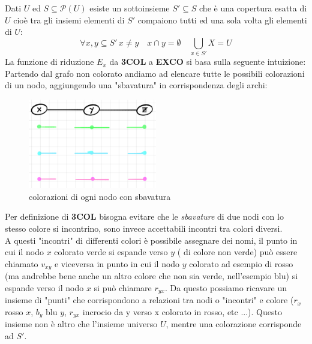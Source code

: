\documentclass[a4paper]{article}
\begin{document}
Dati $U$ ed $S \subseteq \mathcal{P}(U)$ esiste un sottoinsieme $S' \subseteq S$ che è una copertura esatta di $U$ cioè tra gli insiemi elementi di $S'$ compaiono tutti ed una sola volta gli elementi di $U$:
$$\forall x,y \subseteq S'\, x \neq y \quad x \cap y = \emptyset \quad \bigcup_{x \in S'}X = U$$
La funzione di riduzione $E_x$ da \textbf{3COL} a \textbf{EXCO} si basa sulla seguente intuizione:\\
Partendo dal grafo non colorato andiamo ad elencare tutte le possibili colorazioni di un nodo, aggiungendo una "sbavatura" in corrispondenza degli archi:
\newpage
\begin{figure}[!ht]
                \centering
                \includegraphics[width = 0.5\textwidth]{./img/E11_sbavatura.png}
                \caption{colorazioni di ogni nodo con sbavatura} \label{FIG:E11_sbavatura}
\end{figure}
Per definizione di \textbf{3COL} bisogna evitare che le \textit{sbavature} di due nodi con lo stesso colore si incontrino, sono invece accettabili incontri tra colori diversi.\\
A questi "incontri" di differenti colori è possibile assegnare dei nomi, il punto in cui il nodo $x$ colorato verde si espande verso $y$ ( di colore non verde) può essere chiamato $v_{xy}$ e viceversa in punto in cui il nodo $y$ colorato ad esempio di rosso (ma andrebbe bene anche un altro colore che non sia verde, nell'esempio blu) si espande verso il nodo $x$ si può chiamare $r_{yx}$.
Da questo possiamo ricavare un insieme di "punti" che corrispondono a relazioni tra nodi o "incontri" e colore ($r_x$ rosso $x$, $b_y$ blu $y$, $r_{yx}$ incrocio da y verso x colorato in rosso, etc ...).
Questo insieme non è altro che l'insieme universo $U$, mentre una colorazione corrisponde ad $S'$.
\end{document}
